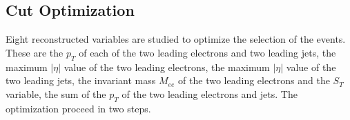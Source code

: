 

\clearpage

\subsection{Cut Optimization} \label{sec:cutOptimization}

Eight reconstructed variables are studied to optimize the selection of the events.
These are the $p_T$ of each of the two leading electrons and two leading jets, the maximum 
$|\eta|$ value of the two leading electrons, the maximum $|\eta|$ value of the two leading jets, 
the invariant mass $M_{ee}$ of the two leading electrons 
and the $S_T$ variable, the sum of the $p_T$ of the two leading electrons and jets.
The optimization proceed in two steps. 

